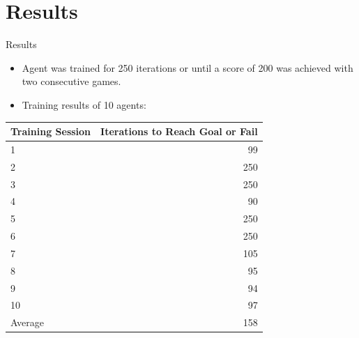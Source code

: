 \documentclass[xcolor=dvipsnames]{beamer}
\begin{document}
\section{Results}
\begin{frame}{Results}
    \begin{itemize}
        \item Agent was trained for 250 iterations or until a score of 200 was achieved with two consecutive games.
        \item Training results of 10 agents:
    \end{itemize}
    \vspace{-0.3cm}
    \begin{table}[h!]
        \centering
        \small
        \begin{tabular}{|l|r|}
            \hline
            \textbf{Training Session} & \textbf{Iterations to Reach Goal or Fail} \\
            \hline
            1 & 99 \\
            2 & 250 \\
            3 & 250 \\
            4 & 90 \\
            5 & 250 \\
            6 & 250 \\
            7 & 105 \\
            8 & 95 \\
            9 & 94 \\
            10 & 97 \\
            \hline
            Average & 158 \\
            \hline
        \end{tabular}
    \end{table}

\end{frame}
\end{document}
